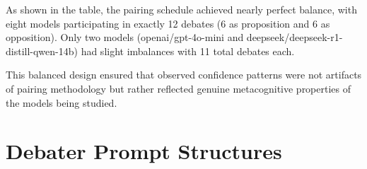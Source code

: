 \documentclass{article}
\begin{document}
As shown in the table, the pairing schedule achieved nearly perfect balance, with eight models participating in exactly 12 debates (6 as proposition and 6 as opposition). Only two models (openai/gpt-4o-mini and deepseek/deepseek-r1-distill-qwen-14b) had slight imbalances with 11 total debates each.

This balanced design ensured that observed confidence patterns were not artifacts of pairing methodology but rather reflected genuine metacognitive properties of the models being studied.






\section{Debater Prompt Structures}
\label{appendix:debater_prompts}
\end{document}
